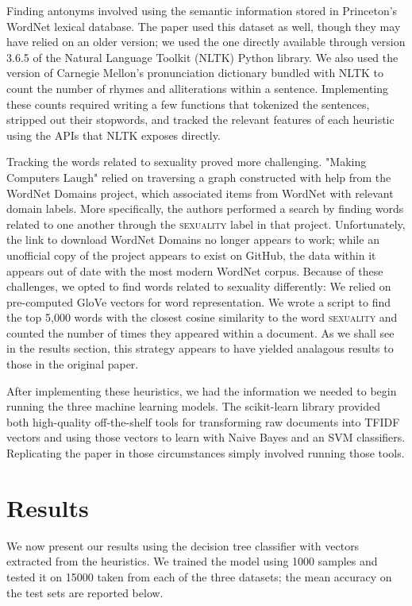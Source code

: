 \documentclass[11pt,a4paper]{article}
\begin{document}
Finding antonyms involved using the semantic information stored in Princeton's WordNet lexical database. The paper used this dataset as well, though they may have relied on an older version; we used the one directly available through version 3.6.5 of the Natural Language Toolkit (NLTK) Python library. \cite{10.5555/1717171} We also used the version of Carnegie Mellon's pronunciation dictionary bundled with NLTK to count the number of rhymes and alliterations within a sentence. Implementing these counts required writing a few functions that tokenized the sentences, stripped out their stopwords, and tracked the relevant features of each heuristic using the APIs that NLTK exposes directly.

Tracking the words related to sexuality proved more challenging. "Making Computers Laugh" relied on traversing a graph constructed with help from the WordNet Domains project, which associated items from WordNet with relevant domain labels. More specifically, the authors performed a search by finding words related to one another through the \textsc{sexuality} label in that project. Unfortunately, the link to download WordNet Domains no longer appears to work; while an unofficial copy of the project appears to exist on GitHub, the data within it appears out of date with the most modern WordNet corpus. Because of these challenges, we opted to find words related to sexuality differently: We relied on pre-computed GloVe vectors for word representation. \cite{pennington-etal-2014-glove} We wrote a script to find the top 5,000 words with the closest cosine similarity to the word \textsc{sexuality} and counted the number of times they appeared within a document. As we shall see in the results section, this strategy appears to have yielded analagous results to those in the original paper.

After implementing these heuristics, we had the information we needed to begin running the three machine learning models. The scikit-learn library provided both high-quality off-the-shelf tools for transforming raw documents into TFIDF vectors and using those vectors to learn with Naive Bayes and an SVM classifiers. \cite{sklearn_api} Replicating the paper in those circumstances simply involved running those tools.

\section{Results}

We now present our results using the decision tree classifier with vectors extracted from the heuristics. We trained the model using 1000 samples and tested it on 15000 taken from each of the three datasets; the mean accuracy on the test sets are reported below.
\end{document}
